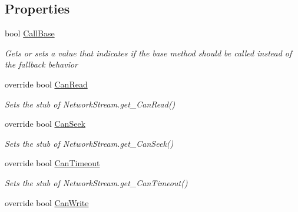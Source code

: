 \subsection*{Properties}
\begin{DoxyCompactItemize}
\item 
bool \hyperlink{class_system_1_1_net_1_1_sockets_1_1_fakes_1_1_stub_network_stream_acfabadafc9dd270f89319409ac20862a}{Call\-Base}
\begin{DoxyCompactList}\small\item\em Gets or sets a value that indicates if the base method should be called instead of the fallback behavior\end{DoxyCompactList}\item 
override bool \hyperlink{class_system_1_1_net_1_1_sockets_1_1_fakes_1_1_stub_network_stream_a5ed2863197276bcfa130bf4e85801cdb}{Can\-Read}
\begin{DoxyCompactList}\small\item\em Sets the stub of Network\-Stream.\-get\-\_\-\-Can\-Read()\end{DoxyCompactList}\item 
override bool \hyperlink{class_system_1_1_net_1_1_sockets_1_1_fakes_1_1_stub_network_stream_ae51e070b652590cc5d9e76181a23ef72}{Can\-Seek}
\begin{DoxyCompactList}\small\item\em Sets the stub of Network\-Stream.\-get\-\_\-\-Can\-Seek()\end{DoxyCompactList}\item 
override bool \hyperlink{class_system_1_1_net_1_1_sockets_1_1_fakes_1_1_stub_network_stream_ae495324b7c6b59f46832a3da5ef1156d}{Can\-Timeout}
\begin{DoxyCompactList}\small\item\em Sets the stub of Network\-Stream.\-get\-\_\-\-Can\-Timeout()\end{DoxyCompactList}\item 
override bool \hyperlink{class_system_1_1_net_1_1_sockets_1_1_fakes_1_1_stub_network_stream_a3a75bd53cedee6e41a4600f76afa6124}{Can\-Write}

\end{DoxyCompactItemize}
